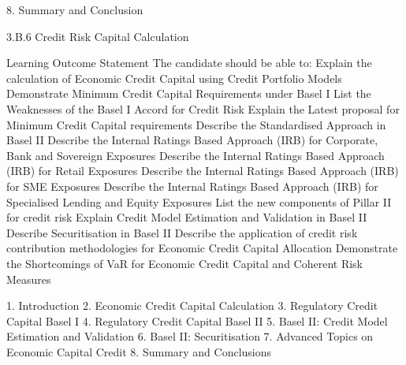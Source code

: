 8. Summary and Conclusion





3.B.6 Credit Risk Capital Calculation

Learning Outcome Statement
The candidate should be able to:
 Explain the calculation of Economic Credit Capital using Credit
Portfolio Models
 Demonstrate Minimum Credit Capital Requirements under Basel I
 List the Weaknesses of the Basel I Accord for Credit Risk
 Explain the Latest proposal for Minimum Credit Capital requirements
 Describe the Standardised Approach in Basel II
 Describe the Internal Ratings Based Approach (IRB) for Corporate, Bank and
Sovereign Exposures
 Describe the Internal Ratings Based Approach (IRB) for Retail Exposures
 Describe the Internal Ratings Based Approach (IRB) for SME Exposures
 Describe the Internal Ratings Based Approach (IRB) for Specialised Lending
and Equity Exposures
 List the new components of Pillar II for credit risk
 Explain Credit Model Estimation and Validation in Basel II
 Describe Securitisation in Basel II
 Describe the application of credit risk contribution methodologies for
Economic Credit Capital Allocation
 Demonstrate the Shortcomings of VaR for Economic Credit Capital and
Coherent Risk Measures


1. Introduction
2. Economic Credit Capital Calculation
3. Regulatory Credit Capital Basel I
4. Regulatory Credit Capital Basel II
5. Basel II: Credit Model Estimation and Validation
6. Basel II: Securitisation
7. Advanced Topics on Economic Capital Credit
8. Summary and Conclusions

